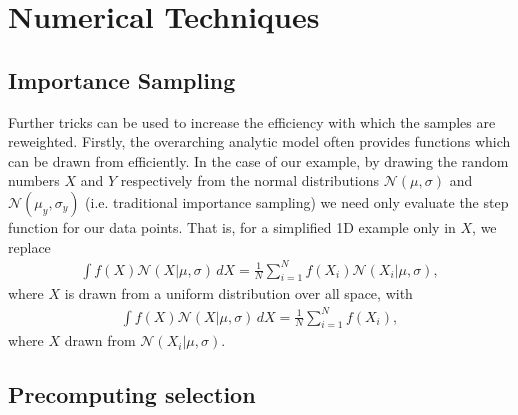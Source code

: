 \documentclass[a4paper,fleqn,usenatbib]{mnras}
\begin{document}
\section{Numerical Techniques}
\label{sec:tricks}

\subsection{Importance Sampling}
Further tricks can be used to increase the efficiency with which the samples are reweighted. Firstly, the overarching analytic model often provides functions which can be drawn from efficiently. In the case of our example, by drawing the random numbers $X$ and $Y$ respectively from the normal distributions $\mathcal{N}(\mu,\sigma)$ and $\mathcal{N}(\mu_y,\sigma_y)$ (i.e. traditional importance sampling) we need only evaluate the step function for our data points. That is, for a simplified 1D example only in $X$, we replace
\begin{align}
\int f(X) \mathcal{N}(X|\mu,\sigma)\, dX = \frac{1}{N} \sum_{i=1}^N f(X_i) \mathcal{N}(X_i | \mu, \sigma),
\end{align}
where $X$ is drawn from a uniform distribution over all space, with 
\begin{align}
\int f(X) \mathcal{N}(X|\mu,\sigma)\, dX = \frac{1}{N} \sum_{i=1}^N f(X_i),
\end{align}
where $X$ drawn from $\mathcal{N}(X_i | \mu, \sigma)$.

\subsection{Precomputing selection}
\end{document}
